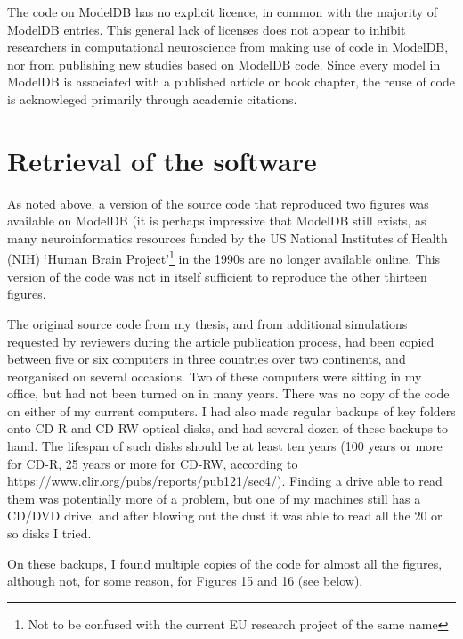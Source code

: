 The code on ModelDB has no explicit licence, in common with the majority of ModelDB entries.
This general lack of licenses does not appear to inhibit researchers in computational neuroscience from
making use of code in ModelDB, nor from publishing new studies based on ModelDB code.
Since every model in ModelDB is associated with a published article or book chapter,
the reuse of code is acknowleged primarily through academic citations.



\section{Retrieval of the software}


As noted above, a version of the source code that reproduced two figures was available on ModelDB
(it is perhaps impressive that ModelDB still exists, as many neuroinformatics resources funded by the
US National Institutes of Health (NIH) `Human Brain Project'\footnote{Not to be confused with the current EU research project of the same name}
in the 1990s are no longer available online.
This version of the code was not in itself sufficient to reproduce the other thirteen figures.

The original source code from my thesis, and from additional simulations requested by reviewers during the article publication process,
had been copied between five or six computers in three countries over two continents,
and reorganised on several occasions. Two of these computers were sitting in my office, but had not been turned on in many years.
There was no copy of the code on either of my current computers.
I had also made regular backups of key folders onto CD-R and CD-RW optical disks, and had several dozen of these backups to hand.
The lifespan of such disks should be at least ten years (100 years or more for CD-R, 25 years or more for CD-RW, according to \url{https://www.clir.org/pubs/reports/pub121/sec4/}). Finding a drive able to read them was potentially more of a problem, but one of my machines
still has a CD/DVD drive, and after blowing out the dust it was able to read all the 20 or so disks I tried.

On these backups, I found multiple copies of the code for almost all the figures, although not, for some reason, for Figures 15 and 16 (see below).

